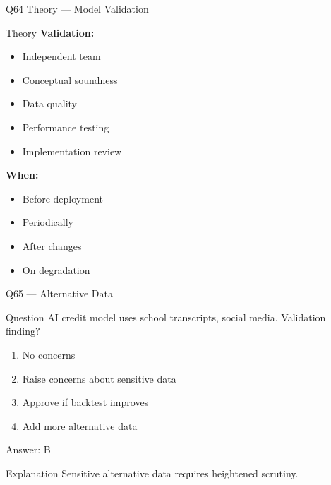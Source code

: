 \documentclass[aspectratio=169,8pt]{beamer}
\begin{document}
	\begin{frame}{Q64 Theory --- Model Validation}
		\begin{block}{Theory}
			\textbf{Validation:}
			\begin{itemize}
				\item Independent team
				\item Conceptual soundness
				\item Data quality
				\item Performance testing
				\item Implementation review
			\end{itemize}
			\textbf{When:}
			\begin{itemize}
				\item Before deployment
				\item Periodically
				\item After changes
				\item On degradation
			\end{itemize}
		\end{block}
	\end{frame}
	
	\begin{frame}{Q65 --- Alternative Data}
		\begin{block}{Question}
			AI credit model uses school transcripts, social media. Validation finding?
		\end{block}
		\begin{enumerate}[label=\Alph*.]
			\item No concerns
			\item Raise concerns about sensitive data
			\item Approve if backtest improves
			\item Add more alternative data
		\end{enumerate}
		\begin{exampleblock}{Answer: B}
		\end{exampleblock}
		\begin{block}{Explanation}
			Sensitive alternative data requires heightened scrutiny.
		\end{block}
	\end{frame}
	
\end{document}

